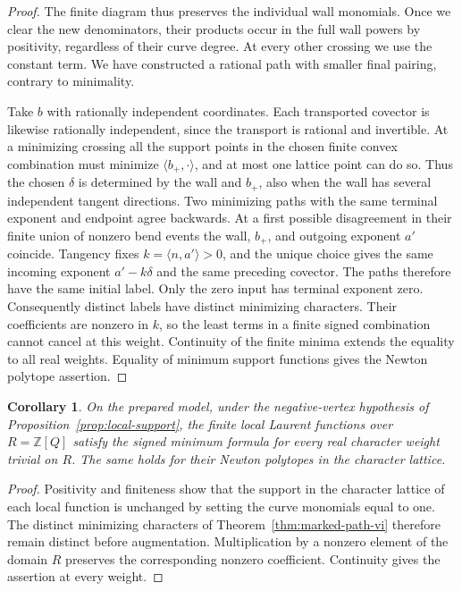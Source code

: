 \documentclass[11pt,reqno]{amsart}
\numberwithin{equation}{section}
\newtheorem{corollary}[theorem]{Corollary}
\theoremstyle{definition}
\theoremstyle{remark}
\begin{document}
\begin{proof}
The finite diagram thus preserves the individual wall monomials.
Once we clear the new denominators, their products occur in the full
wall powers by positivity, regardless of their curve degree. At
every other crossing we use the constant term. We have constructed
a rational path with smaller final pairing, contrary to minimality.

Take \(b\) with rationally independent coordinates. Each transported
covector is likewise rationally independent, since the transport is
rational and invertible. At a minimizing crossing all the support
points in the chosen finite convex combination must minimize
\(\langle b_+,\cdot\rangle\), and at most one lattice point can do so.
Thus the chosen \(\delta\) is determined by the wall and \(b_+\),
also when the wall has several independent tangent directions. Two
minimizing paths with the same terminal exponent and endpoint agree
backwards. At a first possible disagreement in their finite union of
nonzero bend events the wall, \(b_+\), and outgoing exponent \(a'\)
coincide. Tangency fixes \(k=\langle n,a'\rangle>0\), and the unique
choice gives the same incoming exponent \(a'-k\delta\) and the
same preceding covector. The paths therefore have the same initial
label. Only the zero input has terminal exponent zero. Consequently distinct labels have distinct minimizing
characters. Their coefficients are nonzero in \(k\), so the least
terms in a finite signed combination cannot cancel at this weight.
Continuity of the finite minima extends the equality to all real
weights. Equality of minimum support functions gives the Newton
polytope assertion.
\end{proof}

\begin{corollary}\label{cor:effective-marked-vi}
On the prepared model, under the negative-vertex hypothesis of
Proposition~\ref{prop:local-support}, the finite local Laurent functions
over \(R=\mathbb Z[Q]\) satisfy the signed minimum formula for every
real character weight trivial on \(R\). The same holds for their
Newton polytopes in the character lattice.
\end{corollary}
\begin{proof}
Positivity and finiteness show that the support in the character lattice
of each local function is unchanged by setting the curve monomials
equal to one. The distinct minimizing characters of Theorem~\ref{thm:marked-path-vi}
therefore remain distinct before augmentation. Multiplication by a nonzero element of the
domain \(R\) preserves the corresponding nonzero coefficient.
Continuity gives the assertion at every weight.
\end{proof}
\end{document}
